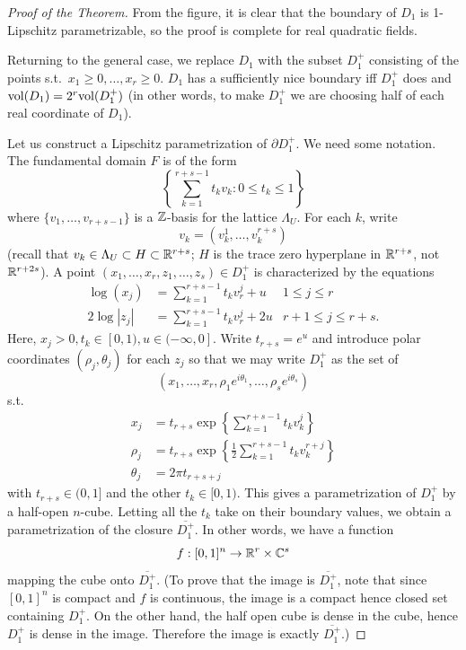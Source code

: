 \documentclass[10pt,a4paper,reqno]{amsart}
\begin{document}
\begin{proof}[Proof of the Theorem]
From the figure, it is clear that the boundary of $D_1$ is 1-Lipschitz
parametrizable, so the proof is complete for real quadratic fields.

Returning to the general case, we replace $D_1$ with the subset $D_1^+$
consisting of the points s.t.~$x_1 \ge 0, \dots, x_r \ge 0.$ $D_1$ has a
sufficiently nice boundary iff $D_1^+$ does and $\mathrm{vol}(D_1) = 2^r \mathrm{vol}(D_1^+)$
(in other words, to make $D_1^+$ we are choosing half of each real coordinate
of $D_1$).

Let us construct a Lipschitz parametrization of $\partial D_1^+.$ We need some
notation. The fundamental domain $F$ is of the form \[\left\{
\sum_{k=1}^{r+s-1} t_k v_k : 0 \le t_k \le 1 \right\}\] where
$\{v_1,\dots,v_{r+s-1}\}$ is a $\mathbb{Z}$-basis for the lattice $\Lambda_U.$ For each
$k$, write \[v_k = (v^1_k,\dots,v^{r+s}_k)\] (recall that $v_k \in \Lambda_U
\subset H \subset \mathbb{R}^{r+s}$; $H$ is the trace zero hyperplane in $\mathbb{R}^{r+s}$,
not $\mathbb{R}^{r+2s}$). A point $(x_1,\dots,x_r,z_1,\dots,z_s)\in D_1^+$ is
characterized by the equations
\begin{align*}
\log(x_j)       &= \sum_{k=1}^{r+s-1} t_k v_r^j + u & 1 \le j \le r \\
2 \log|z_j|     &= \sum_{k=1}^{r+s-1} t_k v_r^j + 2u & r+1 \le j \le r+s.
\end{align*} Here, $x_j > 0, t_k \in [0,1), u\in (-\infty, 0]$. Write $t_{r+s}
= e^u$ and introduce polar coordinates $(\rho_j,\theta_j)$ for each $z_j$ so
that we may write $D_1^+$ as the set of $$(x_1,\dots,x_r,\rho_1
e^{i\theta_1},\dots, \rho_s e^{i\theta_s})$$ s.t.
\begin{align*}
x_j & = t_{r+s}\exp\left\{\sum_{k=1}^{r+s-1} t_k v_k^j \right\} \\
\rho_j &= t_{r+s} \exp\left\{ \frac{1}{2} \sum_{k=1}^{r+s-1} t_k
v_k^{r+j} \right\} \\
\theta_j & = 2\pi t_{r+s+j}
\end{align*} with $t_{r+s} \in (0,1]$ and the other $t_k\in [0,1)$. This gives
a parametrization of $D_1^+$ by a half-open $n$-cube. Letting all the $t_k$
take on their boundary values, we obtain a parametrization of the closure
$\overline{D_1^+}$. In other words, we have a function \[f : [0,1]^n
\rightarrow \mathbb{R}^r\times \mathbb{C}^s\] mapping the cube onto $\overline{D_1^+}$. (To
prove that the image is $\overline{D_1^+}$, note that since $[0,1]^n$ is
compact and $f$ is continuous, the image is a compact hence closed set
containing $D_1^+$. On the other hand, the half open cube is dense in the cube,
hence $D_1^+$ is dense in the image. Therefore the image is exactly
$\overline{D_1^+}$.)


\end{proof}
\end{document}
